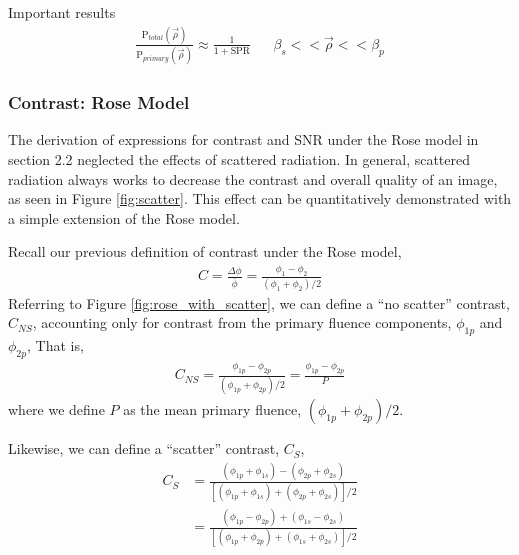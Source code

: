 \documentclass[mphy386-notes.tex]{subfiles}
\begin{document}
Important results
\begin{align}
  \frac{\text{P}_{total}(\vec{\rho})}{\text{P}_{primary}(\vec{\rho})} \approx \frac{1}{1 + \text{SPR}} & & \beta_s << \vec{\rho} << \beta_p
\end{align}

\subsubsection{Contrast: Rose Model}


The derivation of expressions for contrast and SNR under the Rose model in
section 2.2 neglected the effects of scattered radiation. In general,
scattered radiation always works to decrease the contrast and overall
quality of an image, as seen in Figure \ref{fig:scatter}.
This effect can be quantitatively demonstrated with a simple extension
of the Rose model. 


Recall our previous definition of contrast under the Rose model,
\begin{align}
  C = \frac{\Delta \phi}{\bar{\phi}} = \frac{\phi_1 - \phi_2}{(\phi_1 + \phi_2)/2}
\end{align}
Referring to Figure \ref{fig:rose_with_scatter}, we can define a
``no scatter'' contrast, $C_{NS}$, accounting only for contrast from
the primary fluence components, $\phi_{1p}$ and $\phi_{2p}$, That is,
\begin{align}
  C_{NS} = \frac{\phi_{1p} - \phi_{2p}}{(\phi_{1p} + \phi_{2p})/2} = \frac{\phi_{1p} - \phi_{2p}}{P}
\end{align}
where we define $P$ as the mean primary fluence, $(\phi_{1p} + \phi_{2p})/2$.

Likewise, we can define a ``scatter'' contrast, $C_S$,
\begin{align}
  C_S &= \frac{(\phi_{1p} + \phi_{1s}) - (\phi_{2p} + \phi_{2s})}{[(\phi_{1p} + \phi_{1s}) + (\phi_{2p} + \phi_{2s})]/2}\\
      &= \frac{(\phi_{1p} - \phi_{2p}) + (\phi_{1s} - \phi_{2s})}{[(\phi_{1p} + \phi_{2p}) + (\phi_{1s} + \phi_{2s})]/2}\\
\end{align}
\end{document}
